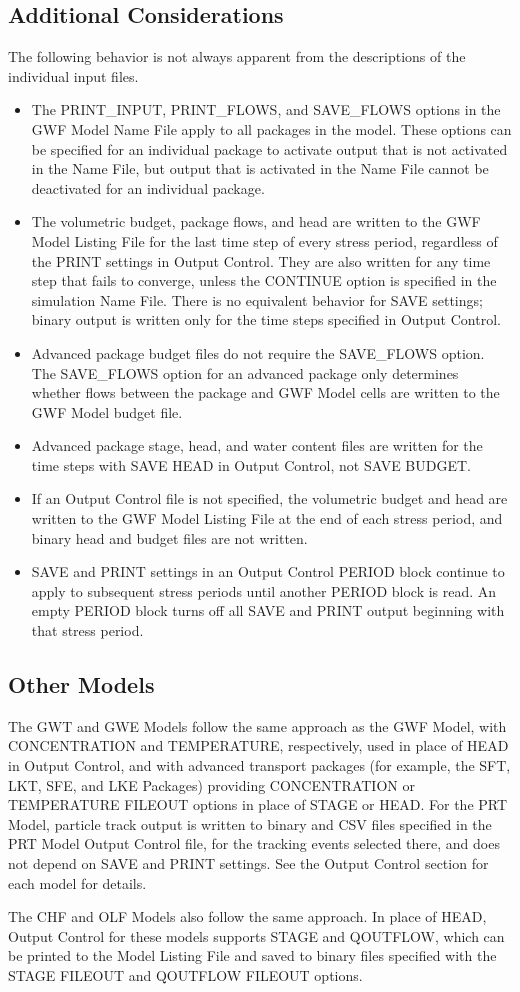 \subsection{Additional Considerations}
The following behavior is not always apparent from the descriptions of the individual input files.

\begin{itemize}
\item The PRINT\_INPUT, PRINT\_FLOWS, and SAVE\_FLOWS options in the GWF Model Name File apply to all packages in the model.  These options can be specified for an individual package to activate output that is not activated in the Name File, but output that is activated in the Name File cannot be deactivated for an individual package.

\item The volumetric budget, package flows, and head are written to the GWF Model Listing File for the last time step of every stress period, regardless of the PRINT settings in Output Control.  They are also written for any time step that fails to converge, unless the CONTINUE option is specified in the simulation Name File.  There is no equivalent behavior for SAVE settings; binary output is written only for the time steps specified in Output Control.

\item Advanced package budget files do not require the SAVE\_FLOWS option.  The SAVE\_FLOWS option for an advanced package only determines whether flows between the package and GWF Model cells are written to the GWF Model budget file.

\item Advanced package stage, head, and water content files are written for the time steps with SAVE HEAD in Output Control, not SAVE BUDGET.

\item If an Output Control file is not specified, the volumetric budget and head are written to the GWF Model Listing File at the end of each stress period, and binary head and budget files are not written.

\item SAVE and PRINT settings in an Output Control PERIOD block continue to apply to subsequent stress periods until another PERIOD block is read.  An empty PERIOD block turns off all SAVE and PRINT output beginning with that stress period.
\end{itemize}

\subsection{Other Models}
The GWT and GWE Models follow the same approach as the GWF Model, with CONCENTRATION and TEMPERATURE, respectively, used in place of HEAD in Output Control, and with advanced transport packages (for example, the SFT, LKT, SFE, and LKE Packages) providing CONCENTRATION or TEMPERATURE FILEOUT options in place of STAGE or HEAD.  For the PRT Model, particle track output is written to binary and CSV files specified in the PRT Model Output Control file, for the tracking events selected there, and does not depend on SAVE and PRINT settings.  See the Output Control section for each model for details.

\ifdevelopmode
The CHF and OLF Models also follow the same approach.  In place of HEAD, Output Control for these models supports STAGE and QOUTFLOW, which can be printed to the Model Listing File and saved to binary files specified with the STAGE FILEOUT and QOUTFLOW FILEOUT options.
\fi
